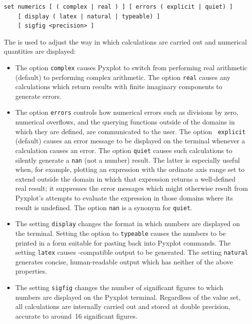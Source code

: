 \begin{verbatim}
set numerics [ ( complex | real ) ] [ errors ( explicit | quiet) ]
    [ display ( latex | natural | typeable) ]
    [ sigfig <precision> ]
\end{verbatim}

The  is used to adjust the way in which calculations are
carried out and numerical quantities are displayed:

\begin{itemize}

\item The option {\tt complex} causes Pyxplot to switch from performing real
arithmetic (default) to performing complex arithmetic. The option {\tt real}
causes any calculations which return results with finite imaginary components
to generate errors.

\item The option {\tt errors} controls how numerical errors such as divisions
by zero, numerical overflows, and the querying functions outside of the domains
in which they are defined, are communicated to the user.  The option {\tt
explicit} (default) causes an error message to be displayed on the terminal
whenever a calculation causes an error.  The option {\tt quiet} causes such
calculations to silently generate a {\tt nan} (not a number) result. The latter
is especially useful when, for example, plotting an expression with the
ordinate axis range set to extend outside the domain in which that expression
returns a well-defined real result; it suppresses the error messages which
might otherwise result from Pyxplot's attempts to evaluate the expression in
those domains where its result is undefined. The option {\tt nan} is a synonym
for {\tt quiet}.

\item The setting {\tt display} changes the format in which numbers are
displayed on the terminal.  Setting the option to {\tt typeable} causes the
numbers to be printed in a form suitable for pasting back into Pyxplot
commands.  The setting {\tt latex} causes \latexdcf-compatible output to be
generated.  The setting {\tt natural} generates concise, human-readable output
which has neither of the above properties.

\item The setting {\tt sigfig} changes the number of significant figures to
which numbers are displayed on the Pyxplot terminal.  Regardless of the value
set, all calculations are internally carried out and stored at double
precision, accurate to around~16 significant figures.

\end{itemize}


